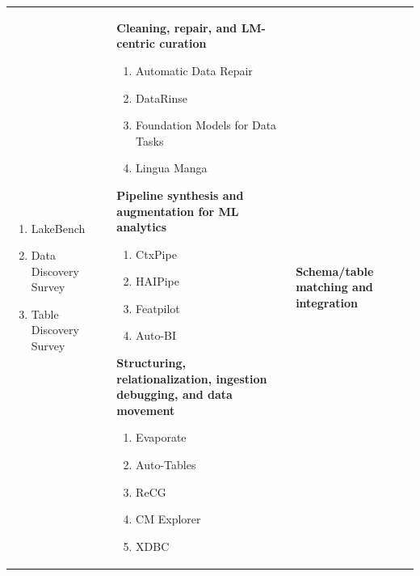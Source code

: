 \documentclass[sigconf]{acmart}
\begin{document}
\begin{table}[t]
\begin{tabularx}{\textwidth}{@{}>{\raggedright\arraybackslash}X>{\raggedright\arraybackslash}X>{\raggedright\arraybackslash}X@{}}
\begin{minipage}[t]{\linewidth}
\begin{enumerate}[leftmargin=*,itemsep=1pt,topsep=1pt]
\item LakeBench~\cite{10.14778/3659437.3659448}
\item Data Discovery Survey~\cite{10.14778/3750601.3750694}
\item Table Discovery Survey~\cite{10.1145/3555041.3589409}
\end{enumerate}
\end{minipage}
&
\begin{minipage}[t]{\linewidth}\vspace{0pt}
\textbf{Cleaning, repair, and LM-centric curation}
\begin{enumerate}[leftmargin=*,itemsep=1pt,topsep=1pt]
\item Automatic Data Repair~\cite{10.14778/3675034.3675051}
\item DataRinse~\cite{10.14778/3611540.3611628}
\item Foundation Models for Data Tasks~\cite{10.14778/3574245.3574258}
\item Lingua Manga~\cite{10.14778/3611540.3611624}
\end{enumerate}
\textbf{Pipeline synthesis and augmentation for ML analytics}
\begin{enumerate}[leftmargin=*,itemsep=1pt,topsep=1pt]
\item CtxPipe~\cite{10.1145/3698831}
\item HAIPipe~\cite{10.1145/3588945}
\item Featpilot~\cite{11113027}
\item Auto-BI~\cite{10.14778/3603581.3603596}
\end{enumerate}
\textbf{Structuring, relationalization, ingestion debugging, and data movement}
\begin{enumerate}[leftmargin=*,itemsep=1pt,topsep=1pt]
\item Evaporate~\cite{10.14778/3626292.3626294}
\item Auto-Tables~\cite{10.1145/3665252.3665269}
\item ReCG~\cite{10.14778/3681954.3682019}
\item CM Explorer~\cite{10.14778/3611540.3611595}
\item XDBC~\cite{10.1145/3725294}
\end{enumerate}
\end{minipage}
&
\begin{minipage}[t]{\linewidth}\vspace{0pt}
\textbf{Schema/table matching and integration}
\begin{enumerate}[leftmargin=*,itemsep=1pt,topsep=1pt]

\end{enumerate}
\end{minipage}
\end{tabularx}
\end{table}
\end{document}
